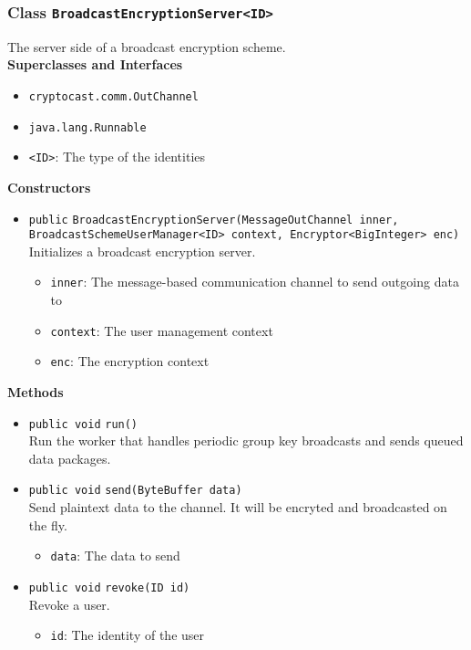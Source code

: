 \subsubsection{Class \lstinline|BroadcastEncryptionServer<ID>|}
The server side of a broadcast encryption scheme. \\


\textbf{Superclasses and Interfaces}
\begin{itemize}
\item \lstinline|cryptocast.comm.OutChannel|
\item \lstinline|java.lang.Runnable|
\end{itemize}

\begin{itemize}
\item \lstinline|<ID>|: The type of the identities
\end{itemize}


\textbf{Constructors}
\begin{itemize}
\item \lstinline|public| \lstinline|BroadcastEncryptionServer|\lstinline|(MessageOutChannel inner, BroadcastSchemeUserManager<ID> context, Encryptor<BigInteger> enc)|\\
Initializes a broadcast encryption server.
\begin{itemize}
\item \lstinline|inner|: The message-based communication channel to send outgoing data to
\item \lstinline|context|: The user management context
\item \lstinline|enc|: The encryption context
\end{itemize}



\end{itemize}


\textbf{Methods}
\begin{itemize}
\item \lstinline|public void| \lstinline|run|\lstinline|()|\\
Run the worker that handles periodic group key broadcasts and sends
 queued data packages.



\item \lstinline|public void| \lstinline|send|\lstinline|(ByteBuffer data)|\\
Send plaintext data to the channel. It will be encryted and broadcasted
 on the fly.
\begin{itemize}
\item \lstinline|data|: The data to send
\end{itemize}



\item \lstinline|public void| \lstinline|revoke|\lstinline|(ID id)|\\
Revoke a user.
\begin{itemize}
\item \lstinline|id|: The identity of the user
\end{itemize}



\end{itemize}

